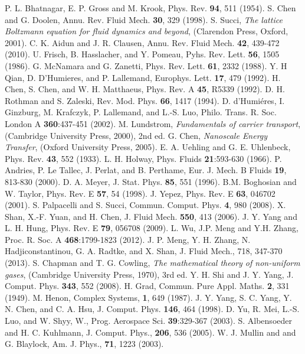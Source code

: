 \documentclass[doublecol]{epl2}
\begin{document}
\begin{thebibliography}{0}

 P. L. Bhatnagar, E. P. Gross and M. Krook, Phys. Rev. {\bf 94}, 511 (1954).
 S. Chen and G. Doolen, Annu. Rev. Fluid Mech. {\bf 30}, 329 (1998).
 S. Succi, {\sl The lattice Boltzmann equation for fluid dynamics and beyond}, (Clarendon Press, Oxford, 2001).
 C. K. Aidun and J. R. Clausen, Annu. Rev. Fluid Mech. {\bf 42}, 439-472 (2010).
 U. Frisch, B. Hasslacher, and Y. Pomeau, Pyhs. Rev. Lett. {\bf 56}, 1505 (1986).
 G. McNamara and G. Zanetti, Phys. Rev. Lett. {\bf 61}, 2332 (1988).
 Y. H Qian, D. D'Humieres, and P. Lallemand, Europhys. Lett. {\bf 17}, 479 (1992).
 H. Chen, S. Chen, and W. H. Matthaeus, Phys. Rev. A {\bf 45}, R5339 (1992).
 D. H. Rothman and S. Zaleski, Rev. Mod. Phys. {\bf 66}, 1417 (1994).
 D. d'Humi\'{e}res, I. Ginzburg, M. Krafczyk, P. Lallemand, and L.-S. Luo, Philo. Trans. R. Soc. London A {\bf 360}:437-451 (2002).
 M. Lundstrom, {\sl Fundamentals of carrier transport}, (Cambridge University Press, 2000), 2nd ed.
 G. Chen, {\sl Nanoscale Energy Transfer}, (Oxford University Press, 2005).
 E. A. Uehling and G. E. Uhlenbeck, Phys. Rev. {\bf 43}, 552 (1933).
 L. H. Holway, Phys. Fluids {\bf 21}:593-630 (1966).
 P. Andries, P. Le Tallec, J. Perlat, and B. Perthame, Eur. J. Mech. B Fluids {\bf 19}, 813-830 (2000).
 D. A. Meyer, J. Stat. Phys. {\bf 85}, 551 (1996).
 B.M. Boghosian and W. Taylor, Phys. Rev. E {\bf 57}, 54 (1998).
 J. Yepez, Phys. Rev. E {\bf 63}, 046702 (2001).
 S. Palpacelli and S. Succi, Commun. Comput. Phys. {\bf 4}, 980 (2008).
 X. Shan, X.-F. Yuan, and H. Chen, J. Fluid Mech. {\bf 550}, 413 (2006).
 J. Y. Yang and L. H. Hung, Phys. Rev. E {\bf 79}, 056708 (2009).
 L. Wu, J.P. Meng  and Y.H. Zhang, Proc. R. Soc. A {\bf 468}:1799-1823 (2012).
 J. P. Meng, Y. H. Zhang, N. Hadjiconstantinou, G. A. Radtke, and X. Shan, J. Fluid Mech., 718, 347-370 (2013).
 S. Chapman and  T. G. Cowling, {\sl The mathematical theory of non-uniform gases}, (Cambridge University Press, 1970), 3rd ed.
 Y. H. Shi and J. Y. Yang, J. Comput. Phys. {\bf 343}, 552 (2008).
 H. Grad, Commun. Pure Appl. Maths. {\bf 2}, 331 (1949).
 M. Henon, Complex Systems, {\bf 1}, 649 (1987).
 J. Y. Yang, S. C. Yang, Y. N. Chen, and C. A. Hsu, J. Comput. Phys. {\bf 146}, 464 (1998).
 D. Yu, R. Mei, L.-S. Luo, and W. Shyy, W., Prog. Aerospace Sci. {\bf 39}:329-367 (2003).
 S. Albensoeder and H. C. Kuhlmann, J. Comput. Phys., {\bf 206}, 536 (2005).
 W. J. Mullin and and G. Blaylock, Am. J. Phys., {\bf 71}, 1223 (2003).

\end{thebibliography}
\end{document}
